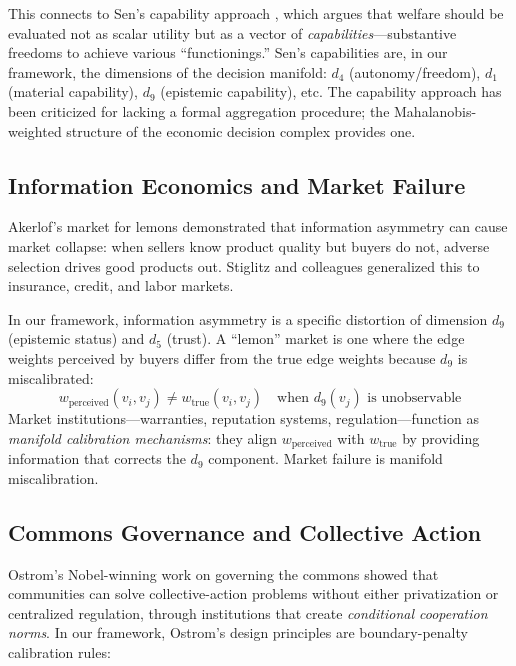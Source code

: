 \documentclass[12pt]{article}
\theoremstyle{definition}
\theoremstyle{remark}
\begin{document}
This connects to Sen's capability approach \cite{sen1999}, which argues that welfare should be evaluated not as scalar utility but as a vector of \emph{capabilities}---substantive freedoms to achieve various ``functionings.''  Sen's capabilities are, in our framework, the dimensions of the decision manifold: $d_4$ (autonomy/freedom), $d_1$ (material capability), $d_9$ (epistemic capability), etc.  The capability approach has been criticized for lacking a formal aggregation procedure; the Mahalanobis-weighted structure of the economic decision complex provides one.

\subsection{Information Economics and Market Failure}

Akerlof's market for lemons \cite{akerlof1970} demonstrated that information asymmetry can cause market collapse: when sellers know product quality but buyers do not, adverse selection drives good products out.  Stiglitz and colleagues \cite{stiglitz1981} generalized this to insurance, credit, and labor markets.

In our framework, information asymmetry is a specific distortion of dimension $d_9$ (epistemic status) and $d_5$ (trust).  A ``lemon'' market is one where the edge weights perceived by buyers differ from the true edge weights because $d_9$ is miscalibrated:
\begin{equation}
w_{\text{perceived}}(v_i, v_j) \neq w_{\text{true}}(v_i, v_j) \quad \text{when } d_9(v_j) \text{ is unobservable}
\end{equation}
Market institutions---warranties, reputation systems, regulation---function as \emph{manifold calibration mechanisms}: they align $w_{\text{perceived}}$ with $w_{\text{true}}$ by providing information that corrects the $d_9$ component.  Market failure is manifold miscalibration.

\subsection{Commons Governance and Collective Action}

Ostrom's \cite{ostrom1990} Nobel-winning work on governing the commons showed that communities can solve collective-action problems without either privatization or centralized regulation, through institutions that create \emph{conditional cooperation norms}.  In our framework, Ostrom's design principles are boundary-penalty calibration rules:
\end{document}
